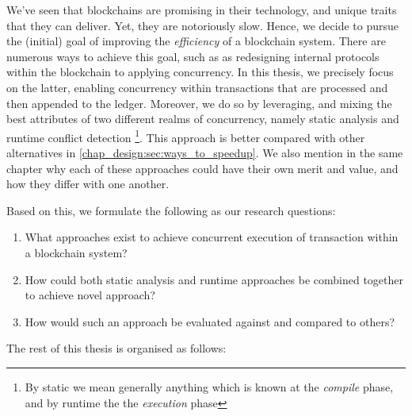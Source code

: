 We've seen that blockchains are promising in their technology, and unique traits that they can
deliver. Yet, they are notoriously slow. Hence, we decide to pursue the (initial) goal of improving
the \textit{efficiency} of a blockchain system. There are numerous ways to
achieve this goal, such as as redesigning internal protocols within the blockchain to applying
concurrency. In this thesis, we precisely focus on the latter, enabling concurrency within
transactions that are processed and then appended to the ledger. Moreover, we do so by leveraging,
and mixing the best attributes of two different realms of concurrency, namely static analysis and
runtime conflict detection \footnote{By static we mean generally anything which is known at the
\textit{compile} phase, and by runtime the the \textit{execution} phase}. This approach is better
compared with other alternatives in \ref{chap_design:sec:ways_to_speedup}. We also mention in
the same chapter why each of these approaches could have their own merit and value, and how they
differ with one another.

Based on this, we formulate the following as our research questions:

 \begin{enumerate}
     \item What approaches exist to achieve concurrent execution of transaction within a blockchain
     system?
	 \item How could both static analysis and runtime approaches be combined together to achieve
	 novel approach?
	 \item How would such an approach be evaluated against and compared to others?
 \end{enumerate}

The rest of this thesis is organised as follows: 

